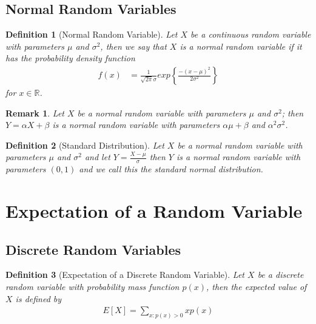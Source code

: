 \documentclass[11pt, oneside]{book}   	%
\newtheorem{definition}{Definition}[chapter]
\newtheorem{remark}{Remark}[chapter]
\begin{document}
\begin{spacing}{1.618}
\subsection{Normal Random Variables}

\begin{definition}[Normal Random Variable]
	Let $X$ be a continuous random variable with parameters $\mu$ and $\sigma^2$, then we say that $X$ is a normal random variable if it has the probability density function
	\begin{alignat}{4}
		f(x)&=\frac{1}{\sqrt{2\pi}\sigma}exp\left\{\frac{-(x-\mu)^2}{2\sigma^2}\right\}
	\end{alignat}
	for $x\in\mathbb{R}$. 
\end{definition}

\begin{remark}
	Let $X$ be a normal random variable with parameters $\mu$ and $\sigma^2$; then $Y=\alpha X+\beta$ is a normal random variable with parameters $\alpha\mu+\beta$ and $\alpha^2\sigma^2$. 
\end{remark}

\begin{definition}[Standard Distribution]
	Let $X$ be a normal random variable with parameters $\mu$ and $\sigma^2$ and let $Y=\frac{X-\mu}{\sigma}$ then $Y$ is a normal random variable with parameters $(0, 1)$ and we call this the standard normal distribution. 
\end{definition}

\section{Expectation of a Random Variable}

\subsection{Discrete Random Variables}

\begin{definition}[Expectation of a Discrete Random Variable]
	Let $X$ be a discrete random variable with probability mass function $p(x)$, then the \emph{expected value} of $X$ is defined by
	\begin{alignat}{4}
		E[X]=\sum_{x:p(x)>0} xp(x)
	\end{alignat}
\end{definition}


\end{spacing}
\end{document}
